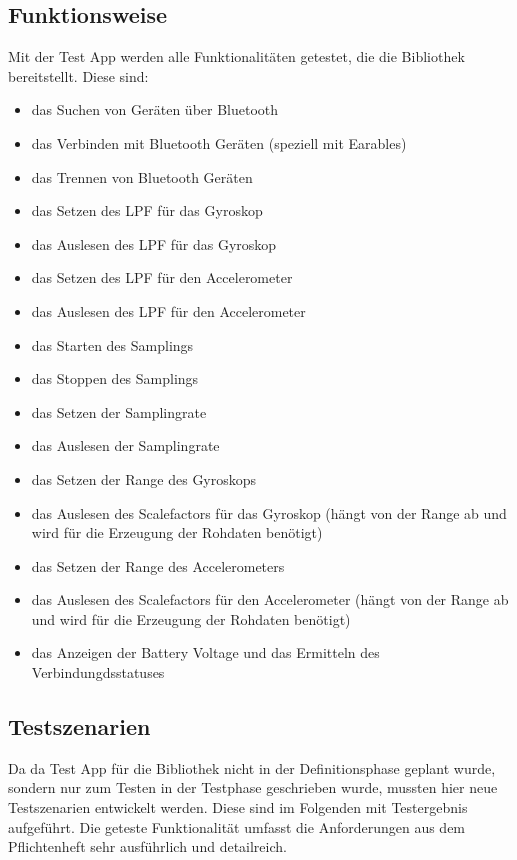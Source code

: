 \documentclass[a4paper,12pt]{article}
\begin{document}
 \subsection{Funktionsweise}
Mit der Test App werden alle Funktionalitäten getestet, die die Bibliothek bereitstellt. Diese sind:
\begin{itemize}
	\item das Suchen von Geräten über Bluetooth
	\item das Verbinden mit Bluetooth Geräten (speziell mit Earables)
	\item das Trennen von Bluetooth Geräten
	\item das Setzen des LPF für das Gyroskop
	\item das Auslesen des LPF für das Gyroskop
	\item das Setzen des LPF für den Accelerometer
	\item das Auslesen des LPF für den Accelerometer
	\item das Starten des Samplings
	\item das Stoppen des Samplings
	\item das Setzen der Samplingrate
	\item das Auslesen der Samplingrate
	\item das Setzen der Range des Gyroskops
	\item das Auslesen des Scalefactors für das Gyroskop (hängt von der Range ab und wird für die Erzeugung der Rohdaten benötigt)
	\item das Setzen der Range des Accelerometers
	\item das Auslesen des Scalefactors für den Accelerometer (hängt von der Range ab und wird für die Erzeugung der Rohdaten benötigt)
	\item das Anzeigen der Battery Voltage und das Ermitteln des Verbindungdsstatuses
\end{itemize}

\subsection{Testszenarien}
Da da Test App für die Bibliothek nicht in der Definitionsphase geplant wurde, sondern nur zum Testen in der Testphase geschrieben wurde, mussten hier neue Testszenarien entwickelt werden. Diese sind im Folgenden mit Testergebnis aufgeführt. Die geteste Funktionalität umfasst die Anforderungen aus dem Pflichtenheft sehr ausführlich und detailreich.
\end{document}
